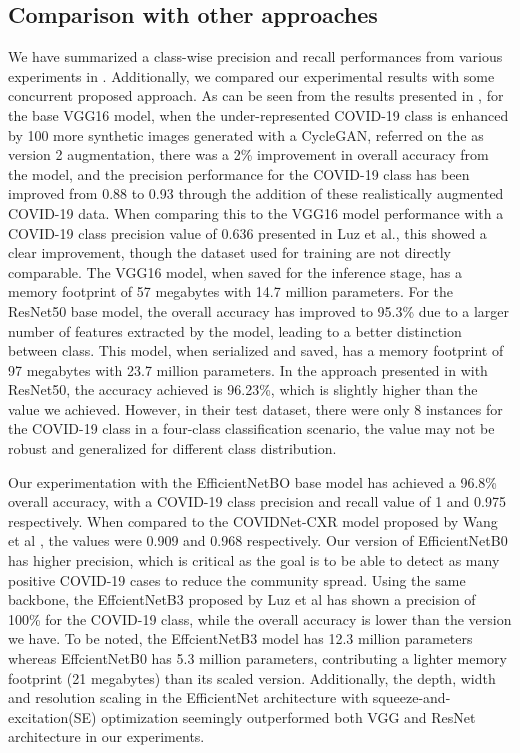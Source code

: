 \subsection{Comparison with other approaches}
We have summarized a class-wise precision and recall performances from various experiments in  . Additionally, we compared our experimental results with some concurrent proposed approach. As can be seen from the results presented in , for the base VGG16 model, when the under-represented COVID-19 class is enhanced by 100 more synthetic images generated with a CycleGAN, referred on the  as version 2 augmentation, there was a 2\% improvement in overall accuracy from the model, and the precision performance for the COVID-19 class has been improved from 0.88 to 0.93 through the addition of these realistically augmented COVID-19 data. When comparing this to the VGG16 model performance with a COVID-19 class precision value of 0.636 presented in Luz et al.\cite{luz2020efficient}, this showed a clear improvement, though the dataset used for training are not directly comparable. The VGG16 model, when saved for the inference stage, has a memory footprint of 57 megabytes with 14.7 million parameters. For the ResNet50 base model, the overall accuracy has improved to 95.3\% due to a larger number of features extracted by the model, leading to a better distinction between class. This model, when serialized and saved, has a memory footprint of 97 megabytes with 23.7 million parameters. In the approach presented in \cite{farooq2020covid} with ResNet50, the accuracy achieved is 96.23\%, which is slightly higher than the value we achieved. However, in their test dataset, there were only 8 instances for the COVID-19 class in a four-class classification scenario, the value may not be robust and generalized for different class distribution.

Our experimentation with the EfficientNetBO base model has achieved a 96.8\% overall accuracy, with a COVID-19 class precision and recall value of 1 and 0.975 respectively. When compared to the COVIDNet-CXR model proposed by Wang et al \cite{wang2020covid}, the values were 0.909 and 0.968 respectively. Our version of EfficientNetB0 has higher precision, which is critical as the goal is to be able to detect as many positive COVID-19 cases to reduce the community spread.
Using the same backbone, the EffcientNetB3 proposed by Luz et al\cite{luz2020efficient} has shown a precision of 100\% for the COVID-19 class, while the overall accuracy is lower than the version we have. To be noted, the EffcientNetB3 model has 12.3 million parameters whereas EffcientNetB0 has 5.3 million parameters, contributing a lighter memory footprint (21 megabytes) than its scaled version. Additionally, the depth, width and resolution scaling in the EfficientNet architecture with squeeze-and-excitation(SE) optimization seemingly outperformed both VGG and ResNet architecture in our experiments.


